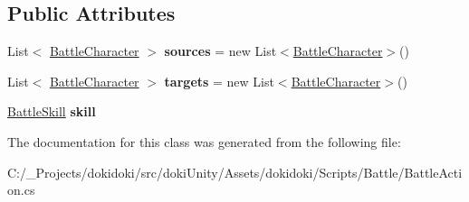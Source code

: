 \subsection*{Public Attributes}
\begin{DoxyCompactItemize}
\item 
List$<$ \hyperlink{classdoki_battle_1_1_battle_character}{Battle\+Character} $>$ {\bfseries sources} = new List$<$\hyperlink{classdoki_battle_1_1_battle_character}{Battle\+Character}$>$()\hypertarget{classdoki_battle_1_1_battle_action_ae1f8bed23539bdb28160007279285c51}{}\label{classdoki_battle_1_1_battle_action_ae1f8bed23539bdb28160007279285c51}

\item 
List$<$ \hyperlink{classdoki_battle_1_1_battle_character}{Battle\+Character} $>$ {\bfseries targets} = new List$<$\hyperlink{classdoki_battle_1_1_battle_character}{Battle\+Character}$>$()\hypertarget{classdoki_battle_1_1_battle_action_a421cc0f7b2bcc2cd0e2cb1be427602fe}{}\label{classdoki_battle_1_1_battle_action_a421cc0f7b2bcc2cd0e2cb1be427602fe}

\item 
\hyperlink{classdoki_battle_1_1_battle_skill}{Battle\+Skill} {\bfseries skill}\hypertarget{classdoki_battle_1_1_battle_action_ac332fdbb3f6a4d4478f9e2b3435092d8}{}\label{classdoki_battle_1_1_battle_action_ac332fdbb3f6a4d4478f9e2b3435092d8}

\end{DoxyCompactItemize}


The documentation for this class was generated from the following file\+:\begin{DoxyCompactItemize}
\item 
C\+:/\+\_\+\+Projects/dokidoki/src/doki\+Unity/\+Assets/dokidoki/\+Scripts/\+Battle/Battle\+Action.\+cs\end{DoxyCompactItemize}
